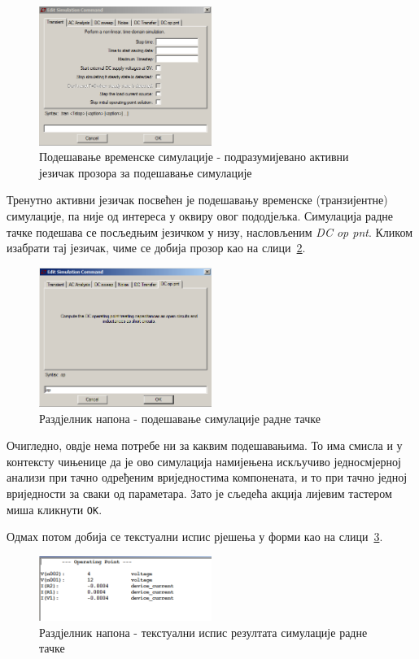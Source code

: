 \begin{figure}[h]
\centering
\includegraphics[width=0.5\textwidth]{figs/rn-tran0.PNG}
\caption{Подешавање временске симулације - подразумијевано активни језичак прозора за подешавање симулације}
\label{Fig:rn-tran0}
\end{figure}

Тренутно активни језичак посвећен је подешавању временске (транзијентне) симулације, па није од интереса у оквиру овог пододјељка. Симулација радне тачке подешава се посљедњим језичком у низу, насловљеним \textit{DC op pnt}. Кликом изабрати тај језичак, чиме се добија прозор као на слици~\ref{Fig:rn-op0}.

\begin{figure}[h]
\centering
\includegraphics[width=0.5\textwidth]{figs/rn-op0.PNG}
\caption{Раздјелник напона - подешавање симулације радне тачке}
\label{Fig:rn-op0}
\end{figure}

Очигледно, овдје нема потребе ни за каквим подешавањима. То има смисла и у контексту чињенице да је ово симулација намијењена искључиво једносмјерној анализи при тачно одређеним вриједностима компонената, и то при тачно једној вриједности за сваки од параметара. Зато је сљедећа акција лијевим тастером миша кликнути \texttt{OK}. 

Одмах потом добија се текстуални испис рјешења у форми као на слици~\ref{Fig:rn-op1}.

\begin{figure}[h]
\centering
\includegraphics[width=0.5\textwidth]{figs/rn-op1.PNG}
\caption{Раздјелник напона - текстуални испис резултата симулације радне тачке}
\label{Fig:rn-op1}
\end{figure}

